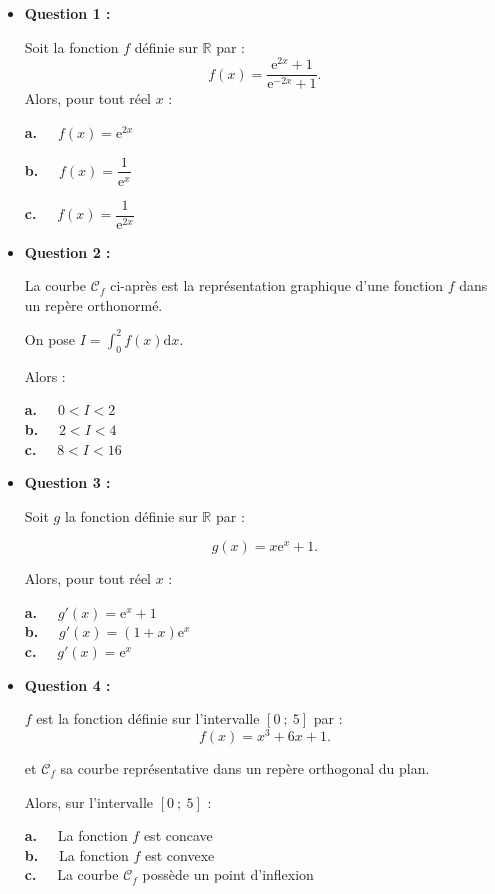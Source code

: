 \begin{itemize}
     \item \textbf{Question 1 :}
     \par
     Soit la fonction $f$ définie sur $\mathbb{R}$ par :
     \[ f(x)=\dfrac{\text{e}^{2x}+1}{\text{e}^{-2x}+1}. \]
     Alors, pour tout réel $x$ :
     \par
     \textbf{a.~~} $f(x)=\text{e}^{2x}$
     \par
     \textbf{b.~~}  $f(x)=\dfrac{1}{\text{e}^{x}}$
     \par
     \textbf{c.~~}  $f(x)=\dfrac{1}{\text{e}^{2x}}$
     \par
     \vspace{5mm}
     \item \textbf{Question 2 :}
     \par
     La courbe $\mathscr{C}_f$ ci-après est la représentation graphique d'une fonction $f$ dans un repère orthonormé.

\begin{center}
\end{center}
     On pose $I= \displaystyle\int_{0}^{2}f(x)\text{d}x$.
     \par
     Alors :
     \par
     \textbf{a.~~} $0 < I < 2$ \\
     \textbf{b.~~} $2 < I < 4$ \\
     \textbf{c.~~} $8 < I < 16$ \\
     \item \textbf{Question 3 :}
     \par
     Soit $g$ la fonction définie sur $\mathbb{R}$ par :
     \par
     \[ g(x)=x \text{e}^{x}+1. \]
     \par
     Alors, pour tout réel $x$ :
     \par
     \textbf{a.~~} $g'(x)=\text{e}^{x}+1$ \\
     \textbf{b.~~} $g'(x)=(1+x)\text{e}^{x}$  \\
     \textbf{c.~~} $g'(x)=\text{e}^{x}$ \\
     \item \textbf{Question 4 :}
     \par
     $f$ est la fonction définie sur l'intervalle $[0~;~5]$ par :
     \[ f(x)=x^3+6x+1. \]
     \par
     et $\mathscr{C}_f$ sa courbe représentative dans un repère orthogonal du plan.
     \par
     Alors, sur l'intervalle $[0~;~5]$  :
     \par
     \textbf{a.~~} La fonction $f$ est concave \\
     \textbf{b.~~} La fonction $f$ est convexe \\
     \textbf{c.~~} La courbe $\mathscr{C}_f$ possède un point d'inflexion \\
     \par
\end{itemize}
